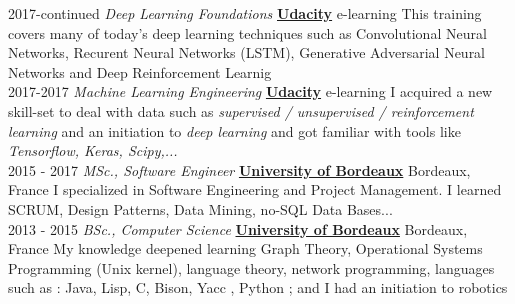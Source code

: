 \documentclass[letterpaper]{twentysecondcv} %
\begin{document}
\begin{twenty} %

  \twentyitem
      {2017-continued}
        {}
        { \textit{Deep Learning Foundations}}
        {\href{http://www.udacity.com/}{\textbf{Udacity}}}
        {e-learning}
        {This training covers many of today's deep learning techniques such as
          Convolutional Neural Networks, Recurent Neural Networks (LSTM),
          Generative Adversarial Neural Networks and Deep Reinforcement Learnig}
    \\
  \twentyitem
      {2017-2017}
        {}
        { \textit{Machine Learning Engineering}}
        {\href{http://www.udacity.com/}{\textbf{Udacity}}}
        {e-learning}
        {I acquired a new skill-set to deal with data such as \textit{supervised /
            unsupervised / reinforcement learning} and an initiation to \textit{deep learning}
          and got familiar with tools like \textit{Tensorflow, Keras, Scipy,...}}
    \\
  \twentyitem
      {2015 - 2017}
        {}
        { \textit{MSc., Software Engineer}}
        {\href{http://www.u-bordeaux.com/}{\textbf{University of Bordeaux}}}
        {Bordeaux, France}
        {I specialized in Software Engineering and Project Management. I learned SCRUM, Design Patterns, Data Mining, no-SQL
Data Bases...}
    \\
  \twentyitem
      {2013 - 2015}
    {}
        { \textit{BSc., Computer Science}}
        {\href{http://www.u-bordeaux.com/}{\textbf{University of Bordeaux}}}
        {Bordeaux, France}
        {My knowledge deepened learning Graph Theory, Operational Systems Programming (Unix kernel), language theory, network programming, languages such as : Java, Lisp, C, Bison, Yacc , Python ; and I had an initiation to robotics}
    \\

\end{twenty}


\end{document}
